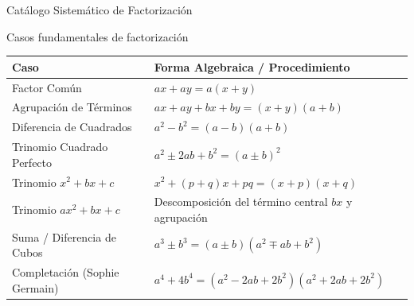 \documentclass[aspectratio=169]{beamer}
\begin{document}
\begin{frame}{Catálogo Sistemático de Factorización}
  \begin{block}{Casos fundamentales de factorización}
    \begin{center}
      \small
      \begin{tabular}{ll}
        \toprule
        \textbf{Caso} & \textbf{Forma Algebraica / Procedimiento} \\
        \midrule
        Factor Común & $ax + ay = a(x + y)$ \\
        Agrupación de Términos & $ax + ay + bx + by = (x + y)(a + b)$ \\
        Diferencia de Cuadrados & $a^2 - b^2 = (a - b)(a + b)$ \\
        Trinomio Cuadrado Perfecto & $a^2 \pm 2ab + b^2 = (a \pm b)^2$ \\
        Trinomio $x^2 + bx + c$ & $x^2 + (p+q)x + pq = (x + p)(x + q)$ \\
        Trinomio $ax^2 + bx + c$ & Descomposición del término central $bx$ y agrupación \\
        Suma / Diferencia de Cubos & $a^3 \pm b^3 = (a \pm b)(a^2 \mp ab + b^2)$ \\
        Completación (Sophie Germain) & $a^4 + 4b^4 = (a^2 - 2ab + 2b^2)(a^2 + 2ab + 2b^2)$ \\
        \bottomrule
      \end{tabular}
    \end{center}
  \end{block}
\end{frame}
\end{document}
